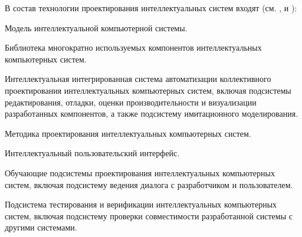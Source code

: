 \begin{partbacktext}
В состав технологии проектирования интеллектуальных систем входят (см. ,  и ):
\begin{textitemize}
	\item Модель интеллектуальной компьютерной системы.
	\item Библиотека многократно используемых компонентов интеллектуальных компьютерных систем.
	\item Интеллектуальная интегрированная система автоматизации коллективного проектирования интеллектуальных компьютерных систем, включая подсистемы редактирования, отладки, оценки производительности и визуализации разработанных компонентов, а также подсистему имитационного моделирования.
	\item Методика проектирования интеллектуальных компьютерных систем.
	\item Интеллектуальный пользовательский интерфейс.
	\item Обучающие подсистемы проектирования интеллектуальных компьютерных систем, включая подсистему ведения диалога с разработчиком и пользователем.
	\item Подсистема тестирования и верификации интеллектуальных компьютерных систем, включая подсистему проверки совместимости разработанной системы с другими системами.
\end{textitemize}

\end{partbacktext}





